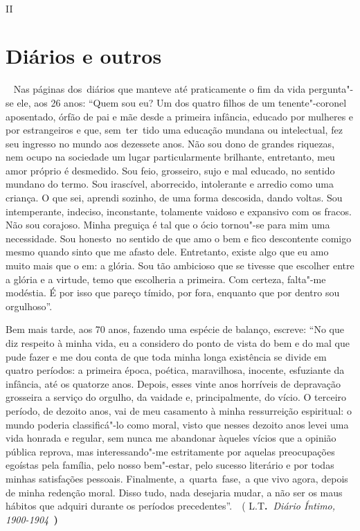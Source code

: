 ~

II

\section{Diários e outros}

~ Nas páginas dos~diários que manteve até praticamente o fim da vida
pergunta"-se ele, aos 26 anos: ``Quem sou eu? Um dos quatro filhos de um
tenente"-coronel aposentado, órfão de pai e mãe desde a primeira
infância, educado por mulheres e por estrangeiros e que, sem~ter~tido
uma educação mundana ou intelectual, fez seu ingresso no mundo aos
dezessete anos. Não sou dono de grandes riquezas, nem ocupo na sociedade
um lugar particularmente brilhante, entretanto, meu amor próprio é
desmedido. Sou feio, grosseiro, sujo e mal educado, no sentido mundano
do termo. Sou irascível, aborrecido, intolerante e arredio como uma
criança. O que sei, aprendi sozinho, de uma forma descosida, dando
voltas. Sou intemperante, indeciso, inconstante, tolamente vaidoso e
expansivo com os fracos. Não sou corajoso. Minha preguiça é tal que o
ócio tornou"-se para mim uma necessidade. Sou honesto~no sentido de que
amo o bem e fico descontente comigo mesmo quando sinto que me afasto
dele. Entretanto, existe algo que eu amo muito mais que o em: a glória.
Sou tão ambicioso que se tivesse que escolher entre a glória e a
virtude, temo que escolheria a primeira. Com certeza, falta"-me modéstia.
É por isso que pareço tímido, por fora, enquanto que por dentro sou
orgulhoso''.

Bem mais tarde, aos 70 anos, fazendo uma espécie de balanço, escreve:
``No que diz respeito à minha vida, eu a considero do ponto de vista do
bem e do mal que pude fazer e me dou conta de que toda minha longa
existência se divide em quatro períodos: a primeira época, poética,
maravilhosa, inocente, esfuziante da infância, até os quatorze anos.
Depois, esses vinte anos horríveis de depravação grosseira a serviço do
orgulho, da vaidade e, principalmente, do vício. O terceiro período, de
dezoito anos, vai de meu casamento à minha ressurreição espiritual: o
mundo poderia classificá"-lo como moral, visto que nesses dezoito anos
levei uma vida honrada e regular, sem nunca me abandonar àqueles vícios
que a opinião pública reprova, mas interessando"-me estritamente por
aquelas preocupações egoístas pela família, pelo nosso bem"-estar, pelo
sucesso literário e por todas minhas satisfações pessoais. Finalmente,
a~quarta~fase,~a que vivo agora, depois de minha redenção moral. Disso
tudo, nada desejaria mudar, a não ser os maus hábitos que adquiri
durante os períodos precedentes''.~~( L.T\textbf{.~}\emph{Diário Íntimo,
1900-1904~}\textbf{)}

